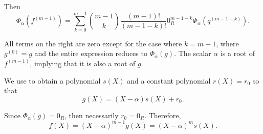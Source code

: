 \begin{defproof}
  Then
  \begin{equation*}
    \Phi_\alpha(f^{(m-1)}) = \sum_{k=0}^{m-1} \binom {m-1} k \frac {(m - 1)!} {(m - 1 - k)!} 0_R^{m - 1 - k} \Phi_\alpha(q^{(m - 1 - k)}).
  \end{equation*}

  All terms on the right are zero except for the case where \( k = m - 1 \), where \( g^{(0)} = g \) and the entire expression reduces to \( \Phi_\alpha(g) \). The scalar \( \alpha \) is a root of \( f^{(m-1)} \), implying that it is also a root of \( g \).

  We use  to obtain a polynomial \( s(X) \) and a constant polynomial \( r(X) = r_0 \) so that
  \begin{equation*}
    g(X) = (X - \alpha) s(X) + r_0.
  \end{equation*}

  Since \( \Phi_\alpha(g) = 0_R \), then necessarily \( r_0 = 0_R \). Therefore,
  \begin{equation*}
    f(X) = (X - \alpha)^{m-1} g(X) = (X - \alpha)^m s(X).
  \end{equation*}
\end{defproof}
